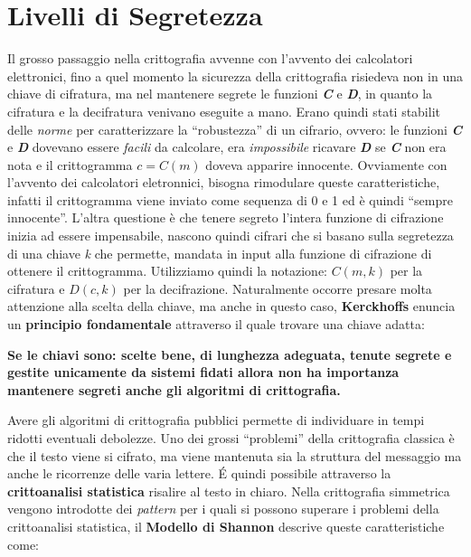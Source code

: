 \section{Livelli di Segretezza}
Il grosso passaggio nella crittografia avvenne con l'avvento dei calcolatori elettronici, fino a quel momento la sicurezza della crittografia risiedeva non in una chiave di cifratura, ma nel mantenere segrete le funzioni \textbf{\textit{C}} e \textbf{\textit{D}}, in quanto la cifratura e la decifratura venivano eseguite a mano. Erano quindi stati stabilit delle \textit{norme} per caratterizzare la ``robustezza'' di un cifrario, ovvero: le funzioni \textbf{\textit{C}} e \textbf{\textit{D}} dovevano essere \textit{facili} da calcolare, era \textit{impossibile} ricavare \textbf{\textit{D}} se \textbf{\textit{C}} non era nota e il crittogramma $c = C(m)$ doveva apparire innocente.
\newline
Ovviamente con l'avvento dei calcolatori eletronnici, bisogna rimodulare queste caratteristiche, infatti il crittogramma viene inviato come sequenza di 0 e 1 ed è quindi ``sempre innocente''. L'altra questione è che tenere segreto l'intera funzione di cifrazione inizia ad essere impensabile, nascono quindi cifrari che si basano sulla segretezza di una chiave \textit{k} che permette, mandata in input alla funzione di cifrazione di ottenere il crittogramma. Utilizziamo quindi la notazione: $C(m, k)$ per la cifratura e $D(c, k)$ per la decifrazione.
\newline
Naturalmente occorre presare molta attenzione alla scelta della chiave, ma anche in questo caso, \textbf{Kerckhoffs} enuncia un \textbf{principio fondamentale} attraverso il quale trovare una chiave adatta:
\begin{center}
    \textbf{Se le chiavi sono: scelte bene, di lunghezza adeguata, tenute segrete e gestite unicamente da sistemi fidati allora non ha importanza mantenere segreti anche gli algoritmi di crittografia.}
\end{center}
Avere gli algoritmi di crittografia pubblici permette di individuare in tempi ridotti eventuali debolezze.
\newline
Uno dei grossi ``problemi'' della crittografia classica è che il testo viene si cifrato, ma viene mantenuta sia la struttura del messaggio ma anche le ricorrenze delle varia lettere. \'{E} quindi possibile attraverso la \textbf{crittoanalisi statistica} risalire al testo in chiaro. Nella crittografia simmetrica vengono introdotte dei \textit{pattern} per i quali si possono superare i problemi della crittoanalisi statistica, il \textbf{Modello di Shannon} descrive queste caratteristiche come:
